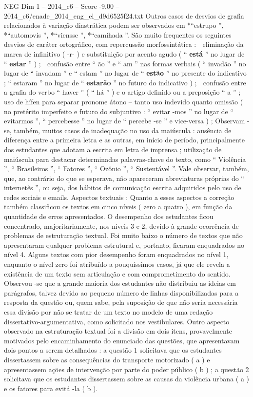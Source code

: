 \begin{textsample}{NEG Dim 1 – 2014\_c6 – Score -9.00 – 2014\_c6/enade\_2014\_eng\_el\_d9d6525f24.txt}
Outros casos de desvios de grafia relacionados à variação diastrática podem ser observados em *“estrupo ”, *“automovís ”, *“viensse ”, *“camihada ”.
São muito frequentes os seguintes desvios de caráter ortográfico, com repercussão morfossintática :  eliminação da marca de infinitivo ( -r- ) e substituição por acento agudo ( “ \textbf{está} ” no lugar de “ \textbf{estar} ” ) ;  confusão entre “ ão ” e “ am ” nas formas verbais ( “ invadão ” no lugar de “ invadam ” e “ estam ” no lugar de “ \textbf{estão} ” no presente do indicativo ; “ estaram ” no lugar de “ \textbf{estarão} ” no futuro do indicativo ) ;  confusão entre a grafia do verbo “ haver ” ( “ há ” ) e o artigo definido ou a preposição “ a ” ;  uso de hífen para separar pronome átono – tanto uso indevido quanto omissão ( no pretérito imperfeito e futuro do subjuntivo : “ evitar -mos ” no lugar de “ evitarmos ”, “ percebesse ” no lugar de “ percebe -se ” e vice-versa ) ; Observam -se, também, muitos casos de inadequação no uso da maiúscula : ausência de diferença entre a primeira letra e as outras, em início de período, principalmente dos estudantes que adotam a escrita em letra de imprensa ; utilização de maiúscula para destacar determinadas palavras-chave do texto, como “ Violência ”, “ Brasileiros ”, “ Fatores ”, “ Ozônio ”, “ Sustentável ”.
Vale observar, também, que, ao contrário do que se esperava, não apareceram abreviaturas próprias do “ internetês ”, ou seja, dos hábitos de comunicação escrita adquiridos pelo uso de redes sociais e emails.
Aspectos textuais : Quanto a esses aspectos a correção também classificou os textos em cinco níveis ( zero a quatro ), em função da quantidade de erros apresentados.
O desempenho dos estudantes ficou concentrado, majoritariamente, nos níveis 3 e 2, devido à grande ocorrência de problemas de estruturação textual.
Foi muito baixo o número de textos que não apresentaram qualquer problema estrutural e, portanto, ficaram enquadrados no nível 4.
Alguns textos com pior desempenho foram enquadrados no nível 1, enquanto o nível zero foi atribuído a pouquíssimos casos, já que ele revela a existência de um texto sem articulação e com comprometimento do sentido.
Observou -se que a grande maioria dos estudantes não distribuiu as ideias em parágrafos, talvez devido ao pequeno número de linhas disponibilizadas para a resposta da questão ou, quem sabe, pela suposição de que não seria necessária essa divisão por não se tratar de um texto no modelo de uma redação dissertativo-argumentativa, como solicitado nos vestibulares.
Outro aspecto observado na estruturação textual foi a divisão em dois itens, provavelmente motivados pelo encaminhamento do enunciado das questões, que apresentavam dois pontos a serem detalhados : a questão 1 solicitava que os estudantes dissertassem sobre as consequências do transporte motorizado ( a ) e apresentassem ações de intervenção por parte do poder público ( b ) ; a questão 2 solicitava que os estudantes dissertassem sobre as causas da violência urbana ( a ) e os fatores para evitá -la ( b ).

\end{textsample}
